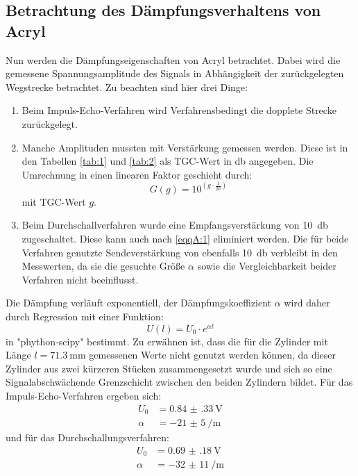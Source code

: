 \subsection{Betrachtung des Dämpfungsverhaltens von Acryl}
Nun werden die Dämpfungseigenschaften von Acryl betrachtet. Dabei wird die gemessene
Spannungsamplitude des Signals in Abhängigkeit der zurückgelegten Wegstrecke betrachtet.
Zu beachten sind hier drei Dinge:
\begin{enumerate}
  \item Beim Impuls-Echo-Verfahren wird Verfahrensbedingt die dopplete Strecke zurückgelegt.
  \item Manche Amplituden mussten mit Verstärkung gemessen werden. Diese ist in den Tabellen
  \ref{tab:1} und \ref{tab:2} als \textsc{TGC}-Wert in \si{\decibel} angegeben. Die Umrechnung in einen
  linearen Faktor geschieht durch:
  \begin{equation}
    G(g) = 10^{ \left( g \cdot \frac{1}{20} \right)}
    \label{eqqA:1}
  \end{equation}
  mit \textsc{TGC}-Wert $g$.
  \item Beim Durchschallverfahren wurde eine Empfangsverstärkung von \SI{10}{\decibel}
  zugeschaltet. Diese kann auch nach \ref{eqqA:1} eliminiert werden. Die für beide Verfahren
  genutzte Sendeverstärkung von ebenfalls \SI{10}{\decibel} verbleibt in den Messwerten,
  da sie die gesuchte Größe $\alpha$ sowie die Vergleichbarkeit beider Verfahren nicht beeinflusst.
\end{enumerate}
Die Dämpfung verläuft exponentiell, der Dämpfungskoeffizient $\alpha$ wird daher durch Regression
mit einer Funktion:
\begin{equation}
  U(l) = U_0 \cdot e^{\alpha l}
\end{equation}
in "phython-scipy" bestimmt. Zu erwähnen ist, dass die für die Zylinder mit Länge
$l=\SI{71.3}{\milli\metre}$ gemessenen Werte nicht genutzt werden können, da dieser
Zylinder aus zwei kürzeren Stücken zusammengesetzt wurde und sich so eine Signalabschwächende
Grenzschicht zwischen den beiden Zylindern bildet. Für das Impuls-Echo-Verfahren ergeben sich:
\begin{align*}
  U_0 &= \SI{0.84(33)}{\volt}\\
  \alpha &= \SI[per-mode=reciprocal]{-21(5)}{\per\metre}
\end{align*}
und für das Durchschallungsverfahren:
\begin{align*}
  U_0 &= \SI{0.69(18)}{\volt}\\
  \alpha &= \SI[per-mode=reciprocal]{-32(11)}{\per\metre}
\end{align*}
